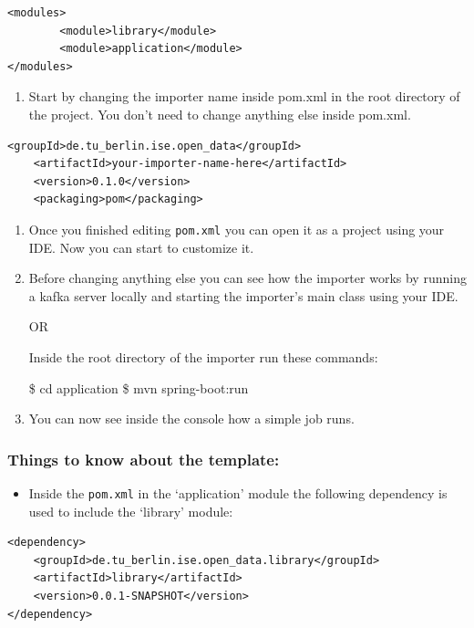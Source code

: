 \documentclass{llncs}
\providecommand{\tightlist}{%
  \setlength{\itemsep}{0pt}\setlength{\parskip}{0pt}}
\begin{document}
\begin{thebibliography}{}
\begin{verbatim}
<modules>
        <module>library</module>
        <module>application</module>
</modules>
\end{verbatim}

\begin{enumerate}
\def\labelenumi{\arabic{enumi}.}
\setcounter{enumi}{1}
\tightlist
\item
  Start by changing the importer name inside pom.xml in the root
  directory of the project. You don't need to change anything else
  inside pom.xml.
\end{enumerate}

\begin{verbatim}
<groupId>de.tu_berlin.ise.open_data</groupId>
    <artifactId>your-importer-name-here</artifactId>
    <version>0.1.0</version>
    <packaging>pom</packaging>
\end{verbatim}

\begin{enumerate}
\def\labelenumi{\arabic{enumi}.}
\setcounter{enumi}{2}
\item
  Once you finished editing \texttt{pom.xml} you can open it as a
  project using your IDE. Now you can start to customize it.
\item
  Before changing anything else you can see how the importer works by
  running a kafka server locally and starting the importer's main class
  using your IDE.

  OR

  Inside the root directory of the importer run these commands:

  \$ cd application \$ mvn spring-boot:run
\item
  You can now see inside the console how a simple job runs.
\end{enumerate}

\subsubsection{Things to know about the
template:}\label{things-to-know-about-the-template}

\begin{itemize}
\tightlist
\item
  Inside the \texttt{pom.xml} in the `application' module the following
  dependency is used to include the `library' module:
\end{itemize}

\begin{verbatim}
<dependency>
    <groupId>de.tu_berlin.ise.open_data.library</groupId>
    <artifactId>library</artifactId>
    <version>0.0.1-SNAPSHOT</version>
</dependency>
\end{verbatim}


\end{thebibliography}
\end{document}

